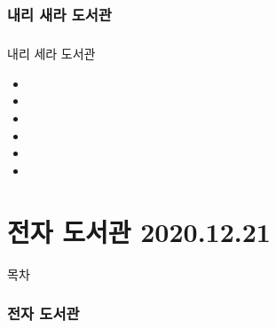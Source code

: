 \documentclass[aspectratio=1610,17pt,xcolor=pdftex,dvipsnames,table,handout]{beamer}
\begin{document}
		\section 	{내리 새라 도서관}

		\begin{frame} [t,plain]
		\frametitle{}

			\begin{block} {내리 세라 도서관}
			\setlength{\leftmargini}{2em}			
			\begin{itemize}
				\item 
				\item 
				\item 
				\item 
				\item 
				\item 
			\end{itemize}
			\end{block}						
		\end{frame}						


		\part{ 전자 도서관 2020.12.21}
		\frame{\partpage}


		\begin{frame} [plain]{목차}
		\tableofcontents%
		\end{frame}



		\section 	{전자 도서관}
\end{document}
